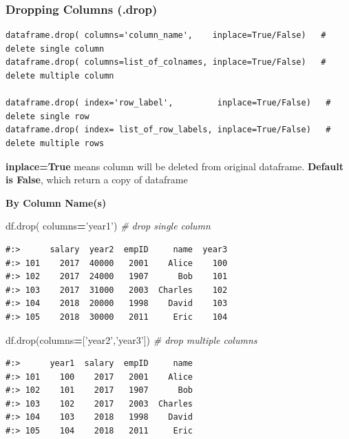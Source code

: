 \documentclass[
]{book}
\newenvironment{Shaded}{\begin{snugshade}}{\end{snugshade}}
\newcommand{\CommentTok}[1]{\textcolor[rgb]{0.37,0.37,0.37}{\textit{#1}}}
\newcommand{\NormalTok}[1]{#1}
\newcommand{\OperatorTok}[1]{\textcolor[rgb]{0.43,0.43,0.43}{\textbf{#1}}}
\newcommand{\StringTok}[1]{\textcolor[rgb]{0.5,0.5,0.5}{#1}}
\begin{document}
\hypertarget{dropping-columns-.drop}{%
\subsubsection{Dropping Columns (.drop)}\label{dropping-columns-.drop}}

\begin{verbatim}
dataframe.drop( columns='column_name',    inplace=True/False)   # delete single column
dataframe.drop( columns=list_of_colnames, inplace=True/False)   # delete multiple column

dataframe.drop( index='row_label',         inplace=True/False)   # delete single row
dataframe.drop( index= list_of_row_labels, inplace=True/False)   # delete multiple rows
\end{verbatim}

\textbf{inplace=True} means column will be deleted from original dataframe. \textbf{Default is False}, which return a copy of dataframe

\textbf{By Column Name(s)}

\begin{Shaded}
\begin{Highlighting}[]
\NormalTok{df.drop( columns}\OperatorTok{=}\StringTok{'year1'}\NormalTok{) }\CommentTok{# drop single column}
\end{Highlighting}
\end{Shaded}

\begin{verbatim}
#:>      salary  year2  empID     name  year3
#:> 101    2017  40000   2001    Alice    100
#:> 102    2017  24000   1907      Bob    101
#:> 103    2017  31000   2003  Charles    102
#:> 104    2018  20000   1998    David    103
#:> 105    2018  30000   2011     Eric    104
\end{verbatim}

\begin{Shaded}
\begin{Highlighting}[]
\NormalTok{df.drop(columns}\OperatorTok{=}\NormalTok{[}\StringTok{'year2'}\NormalTok{,}\StringTok{'year3'}\NormalTok{])  }\CommentTok{# drop multiple columns}
\end{Highlighting}
\end{Shaded}

\begin{verbatim}
#:>      year1  salary  empID     name
#:> 101    100    2017   2001    Alice
#:> 102    101    2017   1907      Bob
#:> 103    102    2017   2003  Charles
#:> 104    103    2018   1998    David
#:> 105    104    2018   2011     Eric
\end{verbatim}
\end{document}
